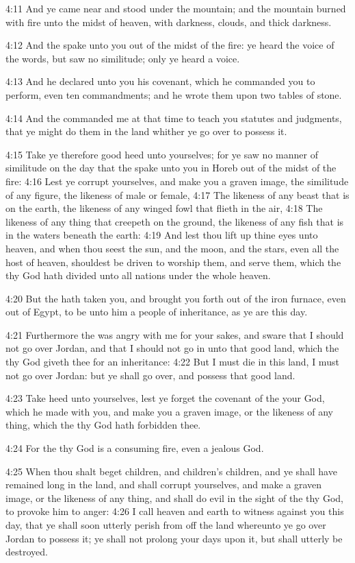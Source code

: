 4:11 And ye came near and stood under the mountain; and the mountain burned with fire unto the midst of heaven, with darkness, clouds, and thick darkness.

4:12 And the \LORD spake unto you out of the midst of the fire: ye heard the voice of the words, but saw no similitude; only ye heard a voice.

4:13 And he declared unto you his covenant, which he commanded you to perform, even ten commandments; and he wrote them upon two tables of stone.

4:14 And the \LORD commanded me at that time to teach you statutes and judgments, that ye might do them in the land whither ye go over to possess it.

4:15 Take ye therefore good heed unto yourselves; for ye saw no manner of similitude on the day that the \LORD spake unto you in Horeb out of the midst of the fire: 4:16 Lest ye corrupt yourselves, and make you a graven image, the similitude of any figure, the likeness of male or female, 4:17 The likeness of any beast that is on the earth, the likeness of any winged fowl that flieth in the air, 4:18 The likeness of any thing that creepeth on the ground, the likeness of any fish that is in the waters beneath the earth: 4:19 And lest thou lift up thine eyes unto heaven, and when thou seest the sun, and the moon, and the stars, even all the host of heaven, shouldest be driven to worship them, and serve them, which the \LORD thy God hath divided unto all nations under the whole heaven.

4:20 But the \LORD hath taken you, and brought you forth out of the iron furnace, even out of Egypt, to be unto him a people of inheritance, as ye are this day.

4:21 Furthermore the \LORD was angry with me for your sakes, and sware that I should not go over Jordan, and that I should not go in unto that good land, which the \LORD thy God giveth thee for an inheritance: 4:22 But I must die in this land, I must not go over Jordan: but ye shall go over, and possess that good land.

4:23 Take heed unto yourselves, lest ye forget the covenant of the \LORD your God, which he made with you, and make you a graven image, or the likeness of any thing, which the \LORD thy God hath forbidden thee.

4:24 For the \LORD thy God is a consuming fire, even a jealous God.

4:25 When thou shalt beget children, and children's children, and ye shall have remained long in the land, and shall corrupt yourselves, and make a graven image, or the likeness of any thing, and shall do evil in the sight of the \LORD thy God, to provoke him to anger: 4:26 I call heaven and earth to witness against you this day, that ye shall soon utterly perish from off the land whereunto ye go over Jordan to possess it; ye shall not prolong your days upon it, but shall utterly be destroyed.

